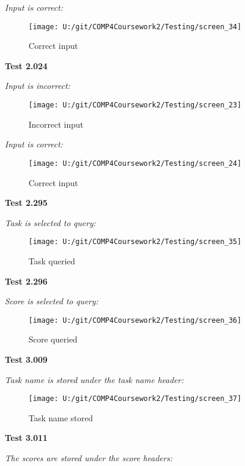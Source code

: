 \textit{Input is correct: }

\begin{figure}[H]
    \label{fig: Second Screen}\caption{Correct input}
    \texttt{[image: U:/git/COMP4Coursework2/Testing/screen\_34]}
\end{figure}

\textbf{Test 2.024}

\textit{Input is incorrect: }

\begin{figure}[H]
    \label{fig: Second Screen}\caption{Incorrect input}
    \texttt{[image: U:/git/COMP4Coursework2/Testing/screen\_23]}
\end{figure}

\textit{Input is correct: }

\begin{figure}[H]
    \label{fig: Second Screen}\caption{Correct input}
    \texttt{[image: U:/git/COMP4Coursework2/Testing/screen\_24]}
\end{figure}

\textbf{Test 2.295}

\textit{Task is selected to query: }

\begin{figure}[H]
    \label{fig: Second Screen}\caption{Task queried}
    \texttt{[image: U:/git/COMP4Coursework2/Testing/screen\_35]}
\end{figure}

\textbf{Test 2.296}

\textit{Score is selected to query: }

\begin{figure}[H]
    \label{fig: Second Screen}\caption{Score queried}
    \texttt{[image: U:/git/COMP4Coursework2/Testing/screen\_36]}
\end{figure}

\textbf{Test 3.009}

\textit{Task name is stored under the task name header: }

\begin{figure}[H]
    \label{fig: Second Screen}\caption{Task name stored}
    \texttt{[image: U:/git/COMP4Coursework2/Testing/screen\_37]}
\end{figure}

\textbf{Test 3.011}

\textit{The scores are stored under the score headers: }

